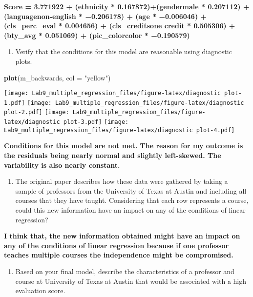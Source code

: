\documentclass[
]{article}
\newenvironment{Shaded}{\begin{snugshade}}{\end{snugshade}}
\newcommand{\AttributeTok}[1]{\textcolor[rgb]{0.13,0.29,0.53}{#1}}
\newcommand{\FunctionTok}[1]{\textcolor[rgb]{0.13,0.29,0.53}{\textbf{#1}}}
\newcommand{\NormalTok}[1]{#1}
\newcommand{\StringTok}[1]{\textcolor[rgb]{0.31,0.60,0.02}{#1}}
\providecommand{\tightlist}{%
  \setlength{\itemsep}{0pt}\setlength{\parskip}{0pt}}
\begin{document}
\textbf{Score = 3.771922 + (ethnicity * 0.167872)+(gendermale *
0.207112) + (languagenon-english * −0.206178) + (age * −0.006046) +
(cls\_perc\_eval * 0.004656) + (cls\_creditsone credit * 0.505306) +
(bty\_avg * 0.051069) + (pic\_colorcolor * −0.190579)}

\begin{enumerate}
\def\labelenumi{\arabic{enumi}.}
\setcounter{enumi}{15}
\tightlist
\item
  Verify that the conditions for this model are reasonable using
  diagnostic plots.
\end{enumerate}

\begin{Shaded}
\begin{Highlighting}[]
\FunctionTok{plot}\NormalTok{(m\_backwards, }\AttributeTok{col =} \StringTok{"yellow"}\NormalTok{)}
\end{Highlighting}
\end{Shaded}

\texttt{[image: Lab9\_multiple\_regression\_files/figure-latex/diagnostic plot-1.pdf]}
\texttt{[image: Lab9\_multiple\_regression\_files/figure-latex/diagnostic plot-2.pdf]}
\texttt{[image: Lab9\_multiple\_regression\_files/figure-latex/diagnostic plot-3.pdf]}
\texttt{[image: Lab9\_multiple\_regression\_files/figure-latex/diagnostic plot-4.pdf]}

\textbf{Conditions for this model are not met. The reason for my outcome
is the residuals being nearly normal and slightly left-skewed. The
variability is also nearly constant.}

\begin{enumerate}
\def\labelenumi{\arabic{enumi}.}
\setcounter{enumi}{16}
\tightlist
\item
  The original paper describes how these data were gathered by taking a
  sample of professors from the University of Texas at Austin and
  including all courses that they have taught. Considering that each row
  represents a course, could this new information have an impact on any
  of the conditions of linear regression?
\end{enumerate}

\textbf{I think that, the new information obtained might have an impact
on any of the conditions of linear regression because if one professor
teaches multiple courses the independence might be compromised.}

\begin{enumerate}
\def\labelenumi{\arabic{enumi}.}
\setcounter{enumi}{17}
\tightlist
\item
  Based on your final model, describe the characteristics of a professor
  and course at University of Texas at Austin that would be associated
  with a high evaluation score.
\end{enumerate}
\end{document}
